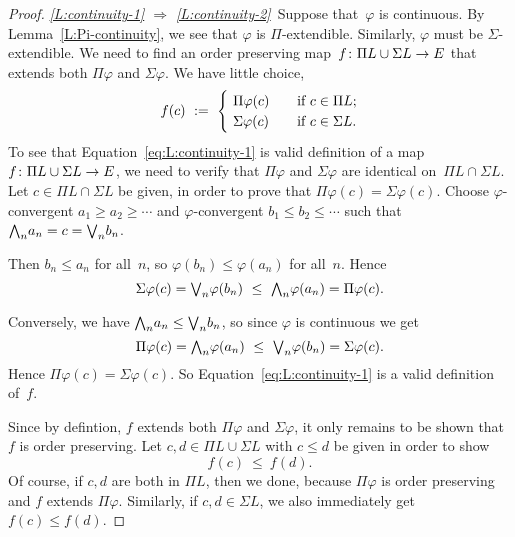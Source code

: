 \documentclass[main.tex]{subfiles}
\begin{document}
\begin{proof}
\noindent
\emph{\ref{L:continuity-1}
$\Longrightarrow$
\ref{L:continuity-2}}\ 
Suppose that~$\varphi$ is continuous.
By Lemma~\ref{L:Pi-continuity},
we see that $\varphi$ is $\Pi$-extendible.
Similarly, $\varphi$ must be $\Sigma$-extendible.
We need to find an order preserving map~$f\colon \Pi L \cup \Sigma L \rightarrow E$
that extends both $\Pi\varphi$ and $\Sigma\varphi$.
We have little choice,
\begin{equation}
\label{eq:L:continuity-1}
f(c) \ \eqdf \ 
\begin{cases}
\ \Pi\varphi(c) \quad& \text{if }c\in \Pi L;\\
\ \Sigma\varphi(c) \quad& \text{if }c\in \Sigma L.
\end{cases}
\end{equation}
To see that Equation~\eqref{eq:L:continuity-1}
is valid definition of a 
map $f\colon \Pi L \cup \Sigma L \rightarrow E$,
we need to verify that $\Pi\varphi$ and $\Sigma\varphi$
are identical on~$\Pi L \cap \Sigma L$.
Let $c\in \Pi L \cap \Sigma L$
be given,
in order to prove that $\Pi\varphi(c) = \Sigma\varphi(c)$.
Choose $\varphi$-convergent
$a_1 \geq a_2 \geq \dotsb$ and
$\varphi$-convergent
$b_1 \leq b_2 \leq \dotsb$
such that $\textstyle{\bigwedge}_n a_n =c= \textstyle{\bigvee}_n b_n$.

Then $b_n \leq a_n$ for all~$n$, so
$\varphi(b_n)\leq \varphi(a_n)$ for all~$n$.
Hence
\begin{equation*}
\Sigma\varphi(c)
=\textstyle{\bigvee}_n \varphi(b_n)
\ \leq\ \textstyle{\bigwedge}_n \varphi(a_n)
=\Pi\varphi(c).
\end{equation*}

Conversely,
we have $\textstyle{\bigwedge}_n a_n \leq \textstyle{\bigvee}_n b_n$,
so since $\varphi$ is continuous we get
\begin{equation*}
\Pi\varphi(c)
=\textstyle{\bigwedge}_n \varphi(a_n)
\ \leq\ \textstyle{\bigvee}_n \varphi(b_n)
=\Sigma\varphi(c).
\end{equation*}
Hence $\Pi\varphi(c)=\Sigma\varphi(c)$.
So Equation~\eqref{eq:L:continuity-1}
is a valid definition of~$f$.

Since by defintion,
$f$ extends both $\Pi\varphi$ and $\Sigma\varphi$,
it only remains to be shown that~$f$ is order preserving.
Let $c,d\in \Pi L \cup \Sigma L$
with $c\leq d$ be given
in order to show
\begin{equation*}
f(c)\ \leq\  f(d).
\end{equation*}
Of course,
if $c,d$ are both in $\Pi L$,
then we done,
because $\Pi \varphi$
is order preserving 
and $f$ extends $\Pi\varphi$.
Similarly, if $c,d\in\Sigma L$, 
we also immediately get $f(c)\leq f(d)$.


\end{proof}
\end{document}
